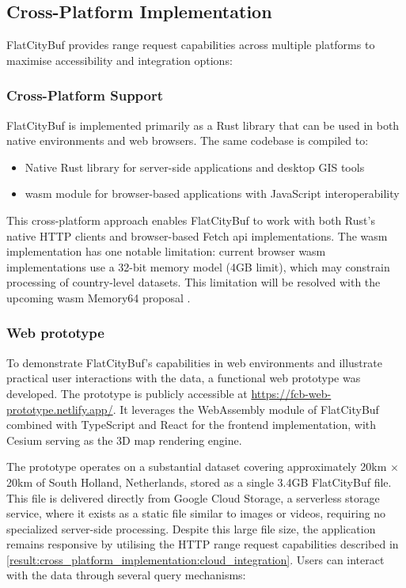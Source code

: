 \subsection{Cross-Platform Implementation}
\label{result:cross_platform_implementation}

FlatCityBuf provides range request capabilities across multiple platforms to maximise accessibility and integration options:
\subsubsection{Cross-Platform Support}
\label{result:cross_platform_implementation:cross_platform}

FlatCityBuf is implemented primarily as a Rust library that can be used in both native environments and web browsers. The same codebase is compiled to:

\begin{itemize}
  \item Native Rust library for server-side applications and desktop GIS tools
  \item \ac{wasm} module for browser-based applications with JavaScript interoperability
\end{itemize}

This cross-platform approach enables FlatCityBuf to work with both Rust's native HTTP clients and browser-based Fetch \ac{api} implementations. The \ac{wasm} implementation has one notable limitation: current browser \ac{wasm} implementations use a 32-bit memory model (4GB limit), which may constrain processing of country-level datasets. This limitation will be resolved with the upcoming \ac{wasm} Memory64 proposal \citep{WebAssemblyCoreSpecification2}.
\subsubsection{Web prototype}
\label{result:cross_platform_implementation:web_prototype}

To demonstrate FlatCityBuf's capabilities in web environments and illustrate practical user interactions with the data, a functional web prototype was developed. The prototype is publicly accessible at \url{https://fcb-web-prototype.netlify.app/}. It leverages the WebAssembly module of FlatCityBuf combined with TypeScript and React for the frontend implementation, with Cesium serving as the 3D map rendering engine.

The prototype operates on a substantial dataset covering approximately 20km $\times$ 20km of South Holland, Netherlands, stored as a single 3.4GB FlatCityBuf file. This file is delivered directly from Google Cloud Storage\citep{gcs}, a serverless storage service, where it exists as a static file similar to images or videos, requiring no specialized server-side processing. Despite this large file size, the application remains responsive by utilising the HTTP range request capabilities described in \autoref{result:cross_platform_implementation:cloud_integration}. Users can interact with the data through several query mechanisms:

